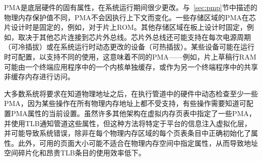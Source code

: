 {\iffalse
PMAs are inherent properties of the underlying hardware and rarely
change during system operation.  Unlike physical memory protection
values described in Section~\ref{sec:pmp}, PMAs do not vary by
execution context.  The PMAs of some memory regions are fixed at chip
design time---for example, for an on-chip ROM.  Others are fixed at
board design time, depending, for example, on which other chips are
connected to off-chip buses.  Off-chip buses might also support
devices that could be changed on every power cycle (cold pluggable) or
dynamically while the system is running (hot pluggable).  Some devices
might be configurable at run time to support different uses that imply
different PMAs---for example, an on-chip scratchpad RAM might be
cached privately by one core in one end-application, or accessed as a
shared non-cached memory in another end-application.
\fi
PMA是底层硬件的固有属性，在系统运行期间很少更改。与~\ref{sec:pmp}节中描述的物理内存保护值不同，PMA不会因执行上下文而变化。一些存储区域的PMA在芯片设计时是固定的，例如，对于片上ROM。其他存储区域在板上设计时固定，例如，取决于其他芯片连接到芯片外总线。芯片外总线还可能支持在每次电源周期（可冷插拔）或在系统运行时动态更改的设备（可热插拔）。某些设备可能在运行时可配置，以支持不同的使用，这意味着不同的PMA——例如，片上草稿行RAM可能由一个终端应用程序中的一个内核单独缓存，或作为另一个终端程序中的共享非缓存内存进行访问。

\iffalse
Most systems will require that at least some PMAs are dynamically
checked in hardware later in the execution pipeline after the physical
address is known, as some operations will not be supported at all
physical memory addresses, and some operations require knowing the
current setting of a configurable PMA attribute.  While many other architectures
specify some PMAs in the virtual memory page tables and use the TLB to
inform the pipeline of these properties, this approach injects platform-specific
information into a virtualized layer and can cause system errors
unless attributes are correctly initialized in each page-table entry
for each physical memory region.  In addition, the available
page sizes might not be optimal for specifying attributes in the
physical memory space, leading to address-space fragmentation and
inefficient use of expensive TLB entries.
\fi
大多数系统将要求在知道物理地址之后，在执行管道中的硬件中动态检查至少一些PMA，因为某些操作在所有物理内存地址上都不受支持，有些操作需要知道可配置PMA属性的当前设置。虽然许多其他架构在虚拟内存页表中指定了一些PMA，并使用TLB通知管道这些属性，但这种方法将特定于平台的信息注入虚拟化层，并可能导致系统错误，除非在每个物理内存区域的每个页表条目中正确初始化了属性。此外，可用的页面大小可能不适合在物理内存空间中指定属性，从而导致地址空间碎片化和昂贵TLB条目的使用效率低下。

}
